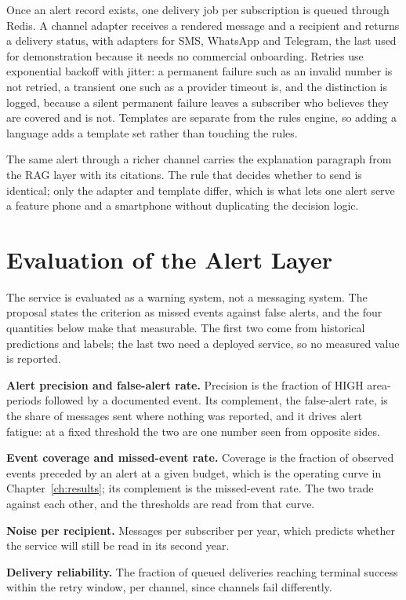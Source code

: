 \documentclass[10pt,openany]{report}
\begin{document}
Once an alert record exists, one delivery job per subscription is queued through Redis. A channel
adapter receives a rendered message and a recipient and returns a delivery status, with adapters for
SMS, WhatsApp and Telegram, the last used for demonstration because it needs no commercial
onboarding. Retries use exponential backoff with jitter: a permanent failure such as an invalid number
is not retried, a transient one such as a provider timeout is, and the distinction is logged, because
a silent permanent failure leaves a subscriber who believes they are covered and is not. Templates are
separate from the rules engine, so adding a language adds a template set rather than touching the
rules.

The same alert through a richer channel carries the explanation paragraph from the RAG layer with its
citations. The rule that decides whether to send is identical; only the adapter and template differ,
which is what lets one alert serve a feature phone and a smartphone without duplicating the decision
logic.

\section{Evaluation of the Alert Layer}

The service is evaluated as a warning system, not a messaging system. The proposal states the
criterion as missed events against false alerts, and the four quantities below make that measurable.
The first two come from historical predictions and labels; the last two need a deployed service, so no
measured value is reported.

\textbf{Alert precision and false-alert rate.} Precision is the fraction of HIGH area-periods followed
by a documented event. Its complement, the false-alert rate, is the share of messages sent where
nothing was reported, and it drives alert fatigue: at a fixed threshold the two are one number seen
from opposite sides.

\textbf{Event coverage and missed-event rate.} Coverage is the fraction of observed events preceded by
an alert at a given budget, which is the operating curve in Chapter~\ref{ch:results}; its complement
is the missed-event rate. The two trade against each other, and the thresholds are read from that
curve.

\textbf{Noise per recipient.} Messages per subscriber per year, which predicts whether the service
will still be read in its second year.

\textbf{Delivery reliability.} The fraction of queued deliveries reaching terminal success within the
retry window, per channel, since channels fail differently.
\end{document}
